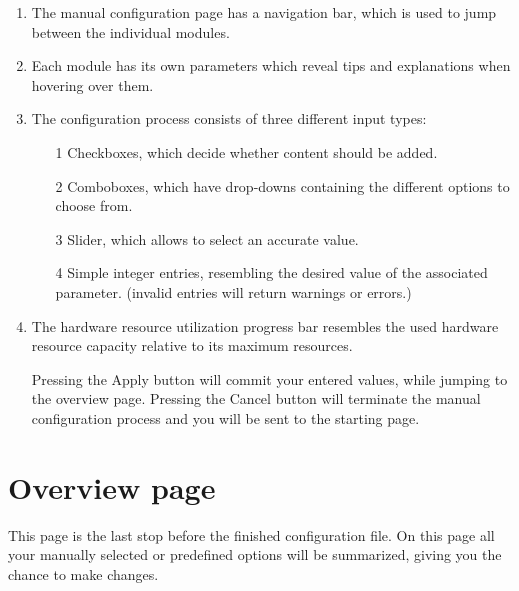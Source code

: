 \begin{enumerate}
	\item The manual configuration page has a navigation bar, which is used to jump between the individual modules.
	\item Each module has its own parameters which reveal tips and explanations when hovering over them.
	\item The configuration process consists of three different input types:

	\begin{enumerate}
		\item[1] Checkboxes, which decide whether content should be added.
		\item[2] Comboboxes, which have drop-downs containing the different options to choose from.
		\item[3] Slider, which allows to select an accurate value.
		\item[4] Simple integer entries, resembling the desired value of the associated parameter.
  (invalid entries will return warnings or errors.)
	\end{enumerate}
	\item The hardware resource utilization progress bar resembles the used hardware resource capacity relative to its maximum resources.

		Pressing the \glqq Apply \grqq{} button will commit your entered values, while jumping to the overview page.
		Pressing the \glqq Cancel \grqq{} button will terminate the manual configuration process and you will be sent to the starting page.

\end{enumerate}
\newpage
\section{Overview page}

This page is the last stop before the finished configuration file. On this page all your manually selected or predefined options will be summarized, giving you the chance to make changes.

